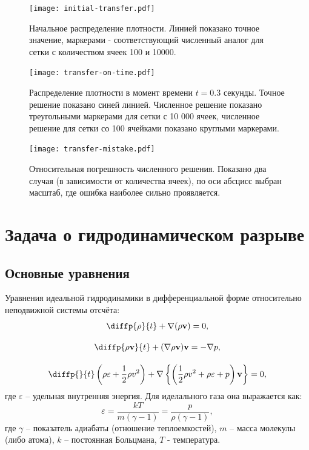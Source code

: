 \documentclass[a4paper]{article}
\begin{document}
	\begin{figure}
		\centering
		\texttt{[image: initial-transfer.pdf]}
		\caption{Начальное распределение плотности. Линией показано точное значение, маркерами - соответствующий численный аналог для сетки с количеством ячеек 100 и 10000.}
		\label{initTransferPlot}
	\end{figure}
	\begin{figure}
		\centering
		\texttt{[image: transfer-on-time.pdf]}
		\caption{Распределение плотности в момент времени $t = 0.3$ секунды. Точное решение показано синей линией. Численное решение показано треугольными маркерами для сетки с 10 000 ячеек, численное решение для сетки со 100 ячейками показано круглыми маркерами.}
		\label{transferPlot}
	\end{figure}
	\begin{figure}
		\centering
		\texttt{[image: transfer-mistake.pdf]}
		\caption{Относительная погрешность численного решения. Показано два случая (в зависимости от количества ячеек), по оси абсцисс выбран масштаб, где ошибка наиболее сильно проявляется.}
		\label{transferMistake}
	\end{figure}
	

	\section{Задача о гидродинамическом разрыве}\label{hydrodynamics}
	\subsection{Основные уравнения}
	Уравнения идеальной гидродинамики в дифференциальной форме относительно неподвижной системы отсчёта:
	\begin{gather}\label{eqHydro}
		\diffp{\rho}{t} + \nabla ( \rho \mathbf{v} ) = 0 ,	\\[10pt]
		\diffp{\rho \mathbf{v}}{t} + (\nabla \rho \mathbf{v}) \mathbf{v} = -\nabla p ,	\\[10pt]
		\diffp{}{t}\left(\rho \varepsilon + \frac{1}{2} \rho v^2 \right) + 
						\nabla \left\{ \left( \frac{1}{2} \rho v^2 + \rho \varepsilon + p \right)\mathbf{v}\right\} = 0 ,
	\end{gather}
	где $\varepsilon$ -- удельная внутренняя энергия. Для иделального газа она выражается как:
	\begin{equation}
		\varepsilon = \dfrac{kT}{m(\gamma-1)} = \dfrac{p}{\rho (\gamma - 1)} ,
	\end{equation}
	где $\gamma$ -- показатель адиабаты (отношение теплоемкостей), $m$ -- масса молекулы (либо атома), $k$ -- постоянная Больцмана, $T$ - температура. 
\end{document}
